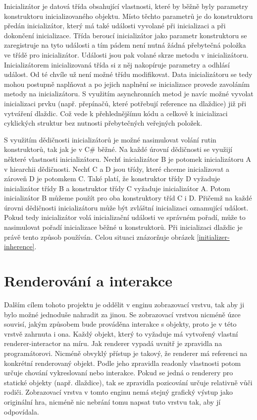 Inicializátor je datová třída obsahující vlastnosti, které by běžně byly parametry konstruktoru inicializovaného objektu.
Místo těchto parametrů je do konstruktoru předán inicializátor, který má také události vyvolané
při inicializaci a při dokončení inicializace. Třída beroucí inicializátor jako parametr konstruktoru se zaregistruje na tyto události a
tím pádem není nutná žádná přebytečná položka ve třídě pro inicializátor. Události jsou pak volané skrze metodu v inicializátoru.
Inicializátorem inicializovaná třída si z něj nakopíruje parametry a odhlásí událost. Od té chvíle už není možné třídu modifikovat.
Data inicializátoru se tedy mohou postupně naplňovat a po jejich naplnění se inicializace provede zavoláním metody na inicializátoru.
S využitím asynchronních metod je navíc možné vyvolat inicializaci prvku  (např. přepínačů, které potřebují reference na dlaždice) 
již při vytváření dlaždic. Což vede k přehlednějšímu kódu a celkově k inicializaci cyklických struktur bez nutnosti přebytečných 
veřejných položek. 

S využitím dědičnosti inicializátorů je možné nasimulovat volání rutin konstruktorů, tak jak je v C\#  běžné. Na každé úrovní dědičnosti
se využijí některé vlastnosti inicializátoru. Nechť inicializátor B
je potomek inicializátoru A v hiearchii dědičnosti. Nechť C a D jsou třídy, které chceme inicializovat a zároveň D je potomkem C.
Také platí, že konstruktor třídy D vyžaduje inicializátor třídy B a konstruktor třídy C vyžaduje inicializátor A. Potom inicializátor B můžeme
použít pro oba konstruktory tříd C i D. Přičemž na každé úrovni dědičnosti inicializátoru může být zvláštní inicializaci oznamující událost.
Pokud tedy inicializátor volá inicializační události ve správném pořadí, může to nasimulovat pořadí inicializace běžné u konstruktorů.
Při inicializaci dlaždic je právě tento způsob používán. Celou situaci znázorňuje obrázek \ref{initializer-inherence}.


\section{Renderování a interakce}\label{renderer-interactor}
Dalším cílem tohoto projektu je oddělit v enginu zobrazovací vrstvu, tak aby ji bylo možné jednoduše nahradit za jinou.
Se zobrazovací vrstvou nicméně úzce souvisí, jakým způsobem bude prováděna interakce s objekty, proto je v této vrstvě zahrnuta i ona. 
Každý objekt, který to vyžaduje má vytvořený vlastní renderer-interactor na míru. Jak renderer vypadá uvnitř je zpravidla na programátorovi. 
Nicméně obvyklý přístup je takový, že renderer má referenci na konkrétní renderovaný objekt. Podle jeho zpravidla readonly vlastnosti potom určuje
chování vykreslovaní nebo interakce. Pokud se jedná o renderery pro statické objekty (např. dlaždice), tak se zpravidla pozicování určuje relativně
vůči rodiči. Zobrazovací vrstva v tomto enginu nemá stejný grafický výstup jako originální hra, nicméně nic nebrání tomu napsat 
 tuto vrstvu tak, aby jí odpovídala.
